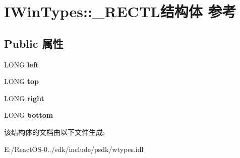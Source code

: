 \hypertarget{struct_i_win_types_1_1___r_e_c_t_l}{}\section{I\+Win\+Types\+:\+:\+\_\+\+R\+E\+C\+T\+L结构体 参考}
\label{struct_i_win_types_1_1___r_e_c_t_l}
\subsection*{Public 属性}
\begin{DoxyCompactItemize}
\item 
\mbox{\label{struct_i_win_types_1_1___r_e_c_t_l_a8614eeb111a1a12e767afa4b03df478d}} 
L\+O\+NG {\bfseries left}
\item 
\mbox{\label{struct_i_win_types_1_1___r_e_c_t_l_a99e7fba90bfb599c2e03f8de4a709a74}} 
L\+O\+NG {\bfseries top}
\item 
\mbox{\label{struct_i_win_types_1_1___r_e_c_t_l_ab35ffa2b04dd671009ab566e22cbae8b}} 
L\+O\+NG {\bfseries right}
\item 
\mbox{\label{struct_i_win_types_1_1___r_e_c_t_l_a1feaf3100a444e9fbb96cd6331c2f212}} 
L\+O\+NG {\bfseries bottom}
\end{DoxyCompactItemize}


该结构体的文档由以下文件生成\+:\begin{DoxyCompactItemize}
\item 
E\+:/\+React\+O\+S-\/0../sdk/include/psdk/wtypes.\+idl\end{DoxyCompactItemize}
